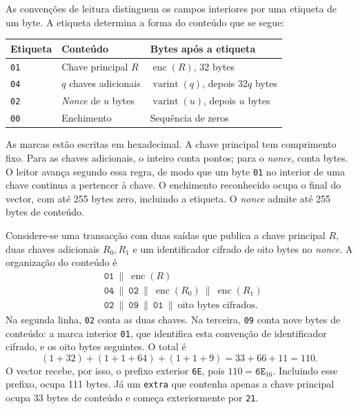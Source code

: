 As convenções de leitura distinguem os campos interiores por uma etiqueta
de um byte. A etiqueta determina a forma do conteúdo que se segue:
\begin{center}
\begin{tabular}{lll}
\hline
Etiqueta & Conteúdo & Bytes após a etiqueta\\
\hline
\texttt{01} & Chave principal \(R\) & \(\operatorname{enc}(R)\), 32 bytes\\
\texttt{04} & \(q\) chaves adicionais & \(\operatorname{varint}(q)\), depois \(32q\) bytes\\
\texttt{02} & \emph{Nonce} de \(u\) bytes & \(\operatorname{varint}(u)\), depois \(u\) bytes\\
\texttt{00} & Enchimento & Sequência de zeros\\
\hline
\end{tabular}
\end{center}
As marcas estão escritas em hexadecimal. A chave principal tem comprimento
fixo. Para as chaves adicionais, o inteiro conta pontos; para o
\emph{nonce}, conta bytes. O leitor avança segundo essa regra, de modo
que um byte \texttt{01} no interior de uma chave continua a pertencer
à chave. O enchimento reconhecido ocupa o final do vector, com até 255
bytes zero, incluindo a etiqueta. O \emph{nonce} admite até 255 bytes
de conteúdo.

Considere-se uma transacção com duas saídas que publica a chave principal
\(R\), duas chaves adicionais \(R_0,R_1\) e um identificador cifrado de
oito bytes no \emph{nonce}. A organização do conteúdo é
\begin{align*}
 &\texttt{01}\ \|\ \operatorname{enc}(R)\\
 &\texttt{04}\ \|\ \texttt{02}\ \|\
       \operatorname{enc}(R_0)\ \|\ \operatorname{enc}(R_1)\\
 &\texttt{02}\ \|\ \texttt{09}\ \|\
       \texttt{01}\ \|\ \text{oito bytes cifrados}.
\end{align*}
Na segunda linha, \texttt{02} conta as duas chaves. Na terceira,
\texttt{09} conta nove bytes de conteúdo: a marca interior \texttt{01},
que identifica esta convenção de identificador cifrado, e os oito bytes
seguintes. O total é
\[
 (1+32)+(1+1+64)+(1+1+9)=33+66+11=110.
\]
O vector recebe, por isso, o prefixo exterior \texttt{6E}, pois
\(110=\texttt{6E}_{16}\). Incluindo esse prefixo, ocupa 111 bytes.
Já um \texttt{extra} que contenha apenas a chave principal ocupa 33
bytes de conteúdo e começa exteriormente por \texttt{21}.

